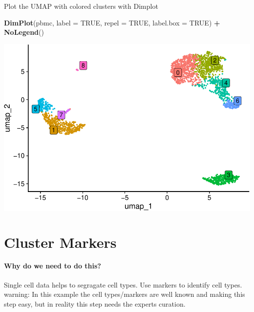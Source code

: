 \documentclass[
]{book}
\newenvironment{Shaded}{\begin{snugshade}}{\end{snugshade}}
\newcommand{\AttributeTok}[1]{\textcolor[rgb]{0.13,0.29,0.53}{#1}}
\newcommand{\ConstantTok}[1]{\textcolor[rgb]{0.56,0.35,0.01}{#1}}
\newcommand{\FunctionTok}[1]{\textcolor[rgb]{0.13,0.29,0.53}{\textbf{#1}}}
\newcommand{\NormalTok}[1]{#1}
\newcommand{\SpecialCharTok}[1]{\textcolor[rgb]{0.81,0.36,0.00}{\textbf{#1}}}
\begin{document}
Plot the UMAP with colored clusters with Dimplot

\begin{Shaded}
\begin{Highlighting}[]
\FunctionTok{DimPlot}\NormalTok{(pbmc, }\AttributeTok{label =} \ConstantTok{TRUE}\NormalTok{, }\AttributeTok{repel =} \ConstantTok{TRUE}\NormalTok{, }\AttributeTok{label.box =} \ConstantTok{TRUE}\NormalTok{) }\SpecialCharTok{+} \FunctionTok{NoLegend}\NormalTok{()}
\end{Highlighting}
\end{Shaded}

\includegraphics{scRNAseqInR_Doco_files/figure-latex/unnamed-chunk-27-1.pdf}

\hypertarget{clustermarkers}{%
\chapter{Cluster Markers}\label{clustermarkers}}

\hypertarget{why-do-we-need-to-do-this-6}{%
\subsubsection*{Why do we need to do this?}\label{why-do-we-need-to-do-this-6}}

Single cell data helps to segragate cell types. Use markers to identify cell types. warning: In this example the cell types/markers are well known and making this step easy, but in reality this step needs the experts curation.

\hypertarget{section-10}{%
\subsubsection*{}\label{section-10}}
\end{document}
